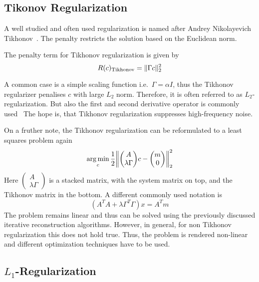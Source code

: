 \subsection{Tikonov Regularization}\label{subsec:tikhonov_regularization}

A well studied and often used regularization is named after Andrey Nikolayevich
Tikhonov~\cite{tihonov_solution_1963}. The penalty restricts the solution based on the Euclidean
norm.

\begin{definition}\label{def:tikhonov_regularization}
	The penalty term for Tikhonov regularization is given by
	\[
		R(c)_{\text{Tikhonov}} = \lVert\Gamma c\rVert_2^2
	\]
\end{definition}
A common case is a simple scaling function i.e.\ \(\Gamma = \alpha I\), thus the Tikhonov
regularizer penalises \(c\) with large \(L_2\) norm. Therefore, it is often referred to as
\(L_2\)-regularization. But also the first and second derivative operator is commonly
used~\cite{golub_tikhonov_1999} The hope is, that Tikhonov regularization suppresses high-frequency
noise.

On a fruther note, the Tikhonov regularization can be reformulated to a least squares problem again
\[
	\argmin_c \frac{1}{2}
	\left\lVert
	\begin{pmatrix}
		A \\
		\lambda \Gamma
	\end{pmatrix}
	c -
	\begin{pmatrix}
		m \\
		0
	\end{pmatrix}
	\right\rVert_2^2
\]
Here \(\begin{pmatrix}
	A \\
	\lambda \Gamma
\end{pmatrix}\) is a stacked matrix, with the system matrix on top, and the Tikhonov matrix in the
bottom. A different commonly used notation is
\[
	(A^T A + \lambda \Gamma^T \Gamma)x = A^T m
\]
The problem remains linear and thus can be solved using the previously discussed iterative
reconstruction algorithms. However, in general, for non Tikhonov regularization this does not hold
true. Thus, the problem is rendered non-linear and different optimization techniques have to be
used.

\subsection{\(L_1\)-Regularization}\label{subsec:l1_regularization}


